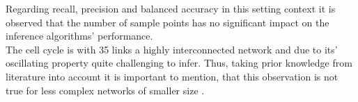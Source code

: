 Regarding recall, precision and balanced accuracy in this setting context it is observed that the number of sample points has no significant impact on the inference algorithms' performance.\\
The cell cycle is with 35 links a highly interconnected network and due to its' oscillating property quite challenging to infer.
Thus, taking prior knowledge from literature into account it is important to mention, that this observation is not true for less complex networks of smaller size \citep{Berestovsky.2013}. %



\newpage
